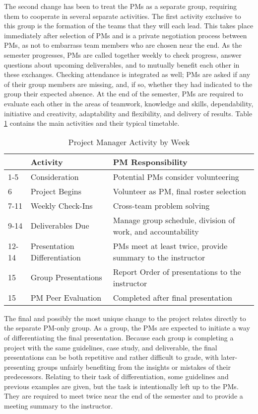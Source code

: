 \documentclass{sig-alternate}
\begin{document}
The second change has been to treat the PMs as a separate group, requiring them to cooperate in
several separate activities. The first activity exclusive to this group is the formation of the teams that they
will each lead. This takes place immediately after selection of PMs and is a private negotiation
process between PMs, as not to embarrass team members who are chosen near the end. As the semester
progresses, PMs are called together weekly to check progress, answer questions about upcoming
deliverables, and to mutually benefit each other in these exchanges. Checking attendance is integrated as
well; PMs are asked if any of their group members are missing, and, if so, whether they had indicated to
the group their expected absence. At the end of the semester, PMs are required to evaluate each other in
the areas of teamwork, knowledge and skills, dependability, initiative and creativity, adaptability and
flexibility, and delivery of results. Table \ref{table:PMtasks} contains the main activities and their typical timetable.

\begin{table}
\label{table:PMtasks}
\caption{Project Manager Activity by Week}
\begin{tabular}{|p{0.3cm}|p{2.9cm}|p{4.0cm}|} \hline
\cellcolor[gray]{0.9}&\textbf{Activity}\cellcolor[gray]{0.9}&\textbf{PM Responsibility}\cellcolor[gray]{0.9}\\ \hline
1-5&Consideration&Potential PMs consider volunteering\\ \hline
6&Project Begins&Volunteer as PM, final roster selection\\ \hline
7-11&Weekly Check-Ins&Cross-team problem solving\\ \hline
9-14&Deliverables Due&Manage group schedule, division of work, and accountability\\ \hline
12-14&Presentation Differentiation&PMs meet at least twice, provide summary to the instructor\\ \hline
15&Group Presentations&Report Order of presentations to the instructor\\ \hline
15&PM Peer Evaluation&Completed after final presentation\\ 
\hline\end{tabular}
\end{table}

The final and possibly the most unique change to the project relates directly to the separate PM-only
group. As a group, the PMs are expected to initiate a way of differentiating the final presentation.
Because each group is completing a project with the same guidelines, case study, and deliverable, the
final presentations can be both repetitive and rather difficult to grade, with later-presenting groups
unfairly benefiting from the insights or mistakes of their predecessors. Relating to their task of
differentiation, some guidelines and previous examples are given, but the task is intentionally left up to
the PMs. They are required to meet twice near the end of the semester and to provide a meeting summary
to the instructor.
\end{document}
